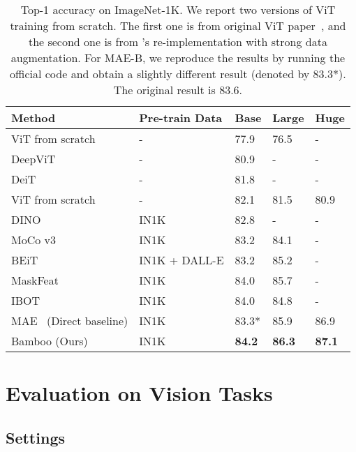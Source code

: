 \documentclass{article}
\theoremstyle{plain}
\theoremstyle{definition}
\theoremstyle{remark}
\begin{document}
\begin{table*}[t]
\caption{Top-1 accuracy on ImageNet-1K. We report two versions of ViT training from scratch. The first one is from original ViT paper~\citep{dosovitskiy2020image}, and the second one is from \citet{he2021masked}'s re-implementation with strong data augmentation. For MAE-B, we reproduce the results by running the official code and obtain a slightly different result (denoted by 83.3*). The original result is 83.6.}
\centering
\small
\begin{tabular}{l llll}

\toprule 
Method             & Pre-train Data    & Base & Large & Huge \\ \midrule
ViT from scratch~\citep{dosovitskiy2020image}            & - & 77.9 & 76.5 & - \\
DeepViT~\citep{zhou2021deepvit}             & - & 80.9 & - & - \\ 
DeiT~\citep{touvron2021training}             & - & 81.8 & - & - \\
ViT from scratch~\citep{he2021masked}            & - & 82.1 & 81.5 & 80.9  \\ \midrule
DINO~\citep{caron2021emerging}             & IN1K & 82.8 & - & -  \\
MoCo v3~\citep{chen2021empirical}             & IN1K & 83.2 & 84.1 & -  \\ \midrule
BEiT~\citep{bao2021beit}             & IN1K + DALL-E & 83.2 & 85.2 & -  \\
MaskFeat~\citep{wei2021masked}             & IN1K & 84.0 & 85.7 & -  \\
IBOT~\citep{zhou2021ibot}             & IN1K & 84.0 & 84.8 & -  \\ \midrule
MAE~\citep{he2021masked} (Direct baseline)           & IN1K & 83.3* & 85.9 & 86.9 \\
Bamboo (Ours)             & IN1K & \textbf{84.2} & \textbf{86.3} & \textbf{87.1} \\\bottomrule
\end{tabular}
\label{tbl:exp-cv-sota}
\vspace{-0.4cm}
\end{table*}


\section{Evaluation on Vision Tasks}\label{Evaluation Vision}



\subsection{Settings} 
\end{document}
